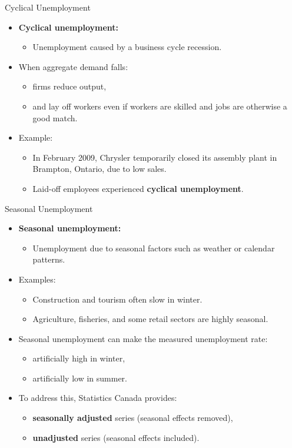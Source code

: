\documentclass[aspectratio=169]{beamer}
\begin{document}
\begin{frame}{Cyclical Unemployment}
\transfade
\begin{itemize}[<+->]
  \item \textbf{Cyclical unemployment:}
  \begin{itemize}[<+->]
    \item Unemployment caused by a \alert{business cycle recession}.
  \end{itemize}
  \item When aggregate demand falls:
  \begin{itemize}[<+->]
    \item firms reduce output,
    \item and lay off workers even if workers are skilled and jobs are otherwise a good match.
  \end{itemize}
  \item Example:
  \begin{itemize}[<+->]
    \item In February 2009, Chrysler temporarily closed its assembly plant in Brampton, Ontario, due to low sales.
    \item Laid-off employees experienced \textbf{cyclical unemployment}.
  \end{itemize}
\end{itemize}
\end{frame}

\begin{frame}{Seasonal Unemployment}
\transfade
\begin{itemize}[<+->]
  \item \textbf{Seasonal unemployment:}
  \begin{itemize}[<+->]
    \item Unemployment due to seasonal factors such as weather or calendar patterns.
  \end{itemize}
  \item Examples:
  \begin{itemize}[<+->]
    \item Construction and tourism often slow in winter.
    \item Agriculture, fisheries, and some retail sectors are highly seasonal.
  \end{itemize}
  \item Seasonal unemployment can make the measured unemployment rate:
  \begin{itemize}[<+->]
    \item artificially high in winter,
    \item artificially low in summer.
  \end{itemize}
  \item To address this, Statistics Canada provides:
  \begin{itemize}[<+->]
    \item \textbf{seasonally adjusted} series (seasonal effects removed),
    \item \textbf{unadjusted} series (seasonal effects included).
  \end{itemize}
\end{itemize}
\end{frame}
\end{document}
